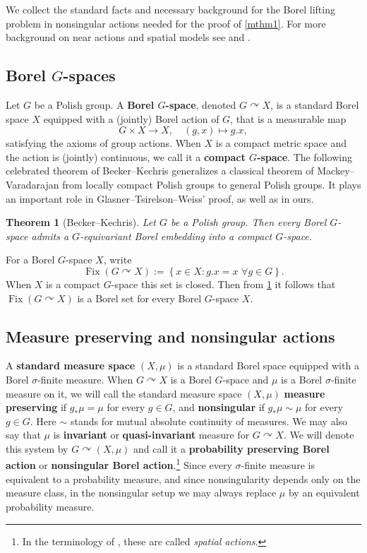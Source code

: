 \documentclass{amsart}
\providecommand{\theoremname}{Theorem}
\numberwithin{equation}{subsection}
\newtheorem{thm}{\protect\theoremname}[section]
\theoremstyle{plain}
\theoremstyle{definition}
\theoremstyle{plain}
\begin{document}
We collect the standard facts and necessary background for the Borel lifting problem in nonsingular actions needed for the proof of \cref{mthm1}. For more background on near actions and spatial models see \cite[Introduction]{glasner2005automorphism} and \cite[\S7.1]{Pestov2006}.

\subsection{Borel \(G\)-spaces}

Let \(G\) be a Polish group. A {\bf Borel \(G\)-space}, denoted \(G\curvearrowright X\), is a standard Borel space \(X\) equipped with a (jointly) Borel action of \(G\), that is a measurable map
\[G\times X\to X,\quad\left(g,x\right)\mapsto g.x,\]
satisfying the axioms of group actions. When \(X\) is a compact metric space and the action is (jointly) continuous, we call it a {\bf compact \(G\)-space}. The following celebrated theorem of Becker--Kechris \cite[Thm.~2.6.6]{becker1996descriptive} generalizes a classical theorem of Mackey--Varadarajan from locally compact Polish groups to general Polish groups. It plays an important role in Glasner--Tsirelson--Weiss' proof, as well as in ours.

\begin{thm}[Becker--Kechris]\label{thm:BecKec}
Let \(G\) be a Polish group. Then every Borel \(G\)-space admits a \(G\)-equivariant Borel embedding into a compact \(G\)-space.
\end{thm}

For a Borel \(G\)-space \(X\), write
\[\operatorname{Fix}\left(G\curvearrowright X\right):=\left\{x\in X:g.x=x\,\,\forall g\in G\right\}.\]
When \(X\) is a compact \(G\)-space this set is closed. Then from \cref{thm:BecKec} it follows that \(\operatorname{Fix}\left(G\curvearrowright X\right)\) is a Borel set for every Borel \(G\)-space \(X\).

\subsection{Measure preserving and nonsingular actions}

A {\bf standard measure space} \(\left(X,\mu\right)\) is a standard Borel space equipped with a Borel \(\sigma\)-finite measure. When \(G\curvearrowright X\) is a Borel \(G\)-space and \(\mu\) is a Borel \(\sigma\)-finite measure on it, we will call the standard measure space \(\left(X,\mu\right)\) {\bf measure preserving} if \(g_{\ast}\mu=\mu\) for every \(g\in G\), and {\bf nonsingular} if \(g_{\ast}\mu\sim\mu\) for every \(g\in G\). Here \(\sim\) stands for mutual absolute continuity of measures. We may also say that \(\mu\) is {\bf invariant} or {\bf quasi-invariant} measure for \(G\curvearrowright X\). We will denote this system by \(G\curvearrowright\left(X,\mu\right)\) and call it a {\bf probability preserving Borel action} or {\bf nonsingular Borel action}.\footnote{In the terminology of \cite{glasner2005automorphism}, these are called \emph{spatial actions}.} Since every \(\sigma\)-finite measure is equivalent to a probability measure, and since nonsingularity depends only on the measure class, in the nonsingular setup we may always replace \(\mu\) by an equivalent probability measure.
\end{document}
